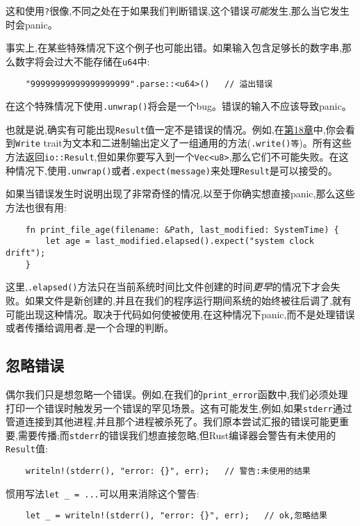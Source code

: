 这和使用\texttt{?}很像,不同之处在于如果我们判断错误,这个错误\emph{可能}发生,那么当它发生时会panic。

事实上,在某些特殊情况下这个例子也可能出错。如果输入包含足够长的数字串,那么数字将会过大不能存储在\texttt{u64}中:
\begin{verbatim}
    "99999999999999999999".parse::<u64>()   // 溢出错误
\end{verbatim}
在这个特殊情况下使用\texttt{.unwrap()}将会是一个bug。错误的输入不应该导致panic。

也就是说,确实有可能出现\texttt{Result}值一定不是错误的情况。例如,在\hyperref[ch18]{第18章}中,你会看到\texttt{Write} trait为文本和二进制输出定义了一组通用的方法(\texttt{.write()等})。所有这些方法返回\texttt{io::Result},但如果你要写入到一个\texttt{Vec<u8>},那么它们不可能失败。在这种情况下,使用\texttt{.unwrap()}或者\texttt{.expect(message)}来处理\texttt{Result}是可以接受的。

如果当错误发生时说明出现了非常奇怪的情况,以至于你确实想直接panic,那么这些方法也很有用:
\begin{verbatim}
    fn print_file_age(filename: &Path, last_modified: SystemTime) {
        let age = last_modified.elapsed().expect("system clock drift");
    }
\end{verbatim}

这里,\texttt{.elapsed()}方法只在当前系统时间比文件创建的时间\emph{更早}的情况下才会失败。如果文件是新创建的,并且在我们的程序运行期间系统的始终被往后调了,就有可能出现这种情况。取决于代码如何使被使用,在这种情况下panic,而不是处理错误或者传播给调用者,是一个合理的判断。

\subsection{忽略错误}\label{ignoreerr}
偶尔我们只是想忽略一个错误。例如,在我们的\texttt{print\_error}函数中,我们必须处理打印一个错误时触发另一个错误的罕见场景。这有可能发生,例如,如果\texttt{stderr}通过管道连接到其他进程,并且那个进程被杀死了。我们原本尝试汇报的错误可能更重要,需要传播;而\texttt{stderr}的错误我们想直接忽略,但Rust编译器会警告有未使用的\texttt{Result}值:
\begin{verbatim}
    writeln!(stderr(), "error: {}", err);   // 警告:未使用的结果
\end{verbatim}

惯用写法\texttt{let \_ = ...}可以用来消除这个警告:
\begin{verbatim}
    let _ = writeln!(stderr(), "error: {}", err);   // ok,忽略结果
\end{verbatim}

